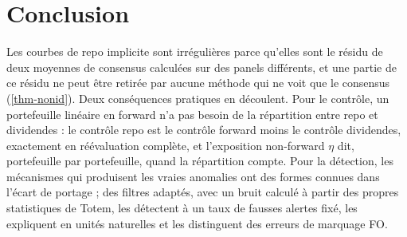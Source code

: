 \section*{Conclusion}
Les courbes de repo implicite sont irrégulières parce qu'elles sont le résidu de deux moyennes de consensus calculées
sur des panels différents, et une partie de ce résidu ne peut être retirée par aucune méthode qui ne voit que le
consensus (\cref{thm-nonid}). Deux conséquences pratiques en découlent. Pour le contrôle, un portefeuille linéaire en
forward n'a pas besoin de la répartition entre repo et dividendes : le contrôle repo est le contrôle forward moins le
contrôle dividendes, exactement en réévaluation complète, et l'exposition non-forward $\eta$ dit, portefeuille par
portefeuille, quand la répartition compte. Pour la détection, les mécanismes qui produisent les vraies anomalies ont
des formes connues dans l'écart de portage ; des filtres adaptés, avec un bruit calculé à partir des propres
statistiques de Totem, les détectent à un taux de fausses alertes fixé, les expliquent en unités naturelles et les
distinguent des erreurs de marquage FO.
